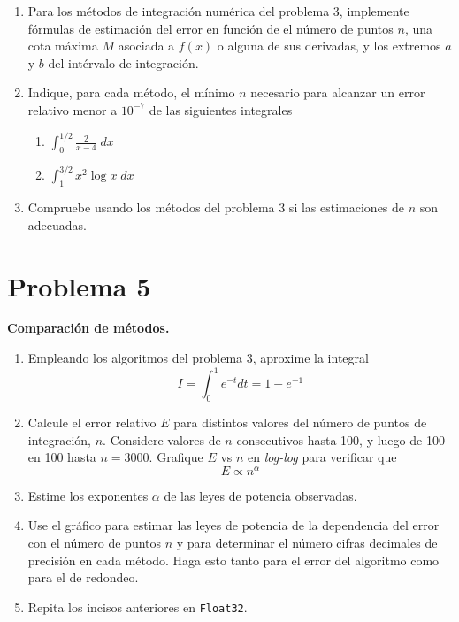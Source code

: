 \documentclass[11pt]{article}
\begin{document}
\begin{enumerate}
\def\labelenumi{\arabic{enumi}.}
\item
  Para los métodos de integración numérica del problema 3, implemente
  fórmulas de estimación del error en función de el número de puntos
  \(n\), una cota máxima \(M\) asociada a \(f(x)\) o alguna de sus
  derivadas, y los extremos \(a\) y \(b\) del intérvalo de integración.
\item
  Indique, para cada método, el mínimo \(n\) necesario para alcanzar un
  error relativo menor a \(10^{-7}\) de las siguientes integrales

  \begin{enumerate}
  \def\labelenumii{\alph{enumii}.}
  \item
    \(\int_0^{1/2} \frac{2}{x-4} \; dx\)
  \item
    \(\int_1^{3/2} x^2 \log x \; dx\)
  \end{enumerate}
\item
  Compruebe usando los métodos del problema 3 si las estimaciones de
  \(n\) son adecuadas.
\end{enumerate}

    \hypertarget{problema-5}{%
\section*{Problema 5}\label{problema-5}}

\textbf{Comparación de métodos.}

\begin{enumerate}
\def\labelenumi{\arabic{enumi}.}
\item
  Empleando los algoritmos del problema 3, aproxime la integral
  \begin{equation*}
  I = \int_0^1 e^{-t} dt = 1 - e^{-1}  \nonumber              
  \end{equation*}
\item
  Calcule el error relativo \(E\) para distintos valores del número de
  puntos de integración, \(n\). Considere valores de \(n\) consecutivos
  hasta 100, y luego de 100 en 100 hasta \(n=3000\). Grafique \(E\) vs
  \(n\) en \emph{log-log} para verificar que \[
  E \propto n^\alpha
  \]
\item
  Estime los exponentes \(\alpha\) de las leyes de potencia observadas.
\item
  Use el gráfico para estimar las leyes de potencia de la dependencia
  del error con el número de puntos \(n\) y para determinar el número
  cifras decimales de precisión en cada método. Haga esto tanto para el
  error del algoritmo como para el de redondeo.
\item
  Repita los incisos anteriores en \texttt{Float32}.
\end{enumerate}
\end{document}
